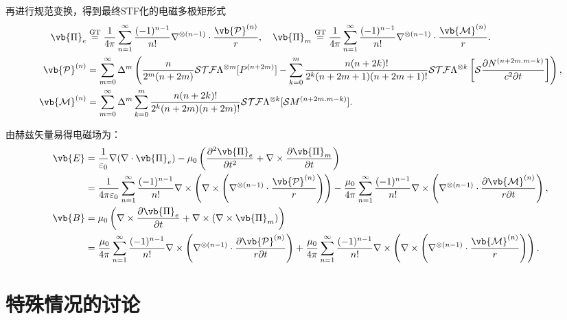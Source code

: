 再进行规范变换，得到最终STF化的电磁多极矩形式
\begin{align*}
	\vb{\Pi}_e &\stackrel{\text{GT}}{=} \frac{1}{4\pi} \sum_{n=1}^{\infty} \frac{(-1)^{n-1}}{n!} \nabla^{\otimes (n-1)} \cdot \frac{\vb{\mathcal{P}}^{(n)}}{r}, \quad \vb{\Pi}_m \stackrel{\text{GT}}{=} \frac{1}{4\pi} \sum_{n=1}^{\infty} \frac{(-1)^{n-1}}{n!} \nabla^{\otimes (n-1)} \cdot \frac{\vb{\mathcal{M}}^{(n)}}{r}.\\
	\vb{\mathcal{P}}^{(n)} &= \sum_{m=0}^{\infty} \Delta^m \left( \frac{n}{2^m (n+2m)} \mathcal{STF}\Lambda^{\otimes m}[P^{(n+2m)}] - \sum_{k=0}^m \frac{n (n+2k)!}{2^k (n+2m+1) (n+2m+1)!} \mathcal{STF}\Lambda^{\otimes k}\left[ \mathcal{S} \frac{\partial N^{(n+2m.m-k)}}{c^2 \partial t} \right] \right), \\
	\vb{\mathcal{M}}^{(n)} &= \sum_{m=0}^{\infty} \Delta^m \sum_{k=0}^m \frac{n (n+2k)!}{2^k (n+2m) (n+2m)!} \mathcal{STF}\Lambda^{\otimes k}[\mathcal{S}M^{(n+2m.m-k)}].
\end{align*}

由赫兹矢量易得电磁场为：
\begin{align*}
	\vb{E} &= \frac{1}{\varepsilon_0} \nabla (\nabla \cdot \vb{\Pi}_e) - \mu_0 \left( \frac{\partial^2 \vb{\Pi}_e}{\partial t^2} + \nabla \times \frac{\partial \vb{\Pi}_m}{\partial t} \right) \\
	&= \frac{1}{4\pi \varepsilon_0} \sum_{n=1}^{\infty} \frac{(-1)^{n-1}}{n!} \nabla \times \left( \nabla \times \left( \nabla^{\otimes (n-1)} \cdot \frac{\vb{\mathcal{P}}^{(n)}}{r} \right) \right) - \frac{\mu_0}{4\pi} \sum_{n=1}^{\infty} \frac{(-1)^{n-1}}{n!} \nabla \times \left( \nabla^{\otimes (n-1)} \cdot \frac{\partial \vb{\mathcal{M}}^{(n)}}{r \partial t} \right), \\
	\vb{B} &= \mu_0 \left( \nabla \times \frac{\partial \vb{\Pi}_e}{\partial t} + \nabla \times (\nabla \times \vb{\Pi}_m) \right) \\
	&= \frac{\mu_0}{4\pi} \sum_{n=1}^{\infty} \frac{(-1)^{n-1}}{n!} \nabla \times \left( \nabla^{\otimes (n-1)} \cdot \frac{\partial \vb{\mathcal{P}}^{(n)}}{r \partial t} \right) + \frac{\mu_0}{4\pi} \sum_{n=1}^{\infty} \frac{(-1)^{n-1}}{n!} \nabla \times \left( \nabla \times \left( \nabla^{\otimes (n-1)} \cdot \frac{\vb{\mathcal{M}}^{(n)}}{r} \right) \right).
\end{align*}

\section{特殊情况的讨论}

